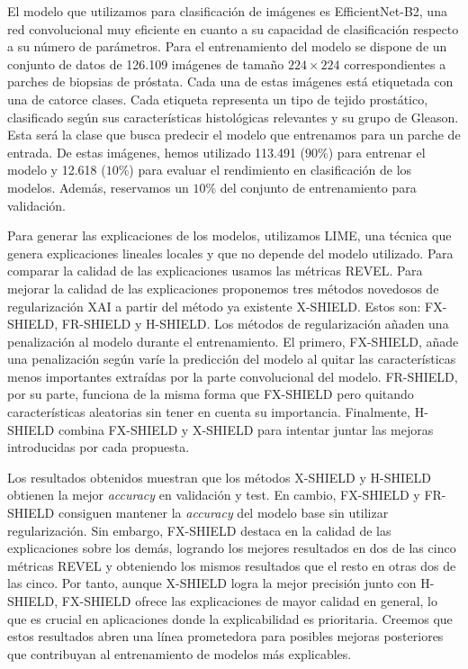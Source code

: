 El modelo que utilizamos para clasificación de imágenes es EfficientNet-B2, una red convolucional muy eficiente en cuanto a su capacidad de clasificación respecto a su número de parámetros. Para el entrenamiento del modelo se dispone de un conjunto de datos de 126.109 imágenes de tamaño $224 \times 224$ correspondientes a parches de biopsias de próstata. Cada una de estas imágenes está etiquetada con una de catorce clases. Cada etiqueta representa un tipo de tejido prostático, clasificado según sus características histológicas relevantes y su grupo de Gleason. Esta será la clase que busca predecir el modelo que entrenamos para un parche de entrada. De estas imágenes, hemos utilizado 113.491 ($90 \%$) para entrenar el modelo y 12.618 ($10 \%$) para evaluar el rendimiento en clasificación de los modelos. Además, reservamos un $10\%$ del conjunto de entrenamiento para validación.

Para generar las explicaciones de los modelos, utilizamos LIME, una técnica que genera explicaciones lineales locales y que no depende del modelo utilizado. Para comparar la calidad de las explicaciones usamos las métricas REVEL. Para mejorar la calidad de las explicaciones proponemos tres métodos novedosos de regularización XAI a partir del método ya existente X-SHIELD. Estos son: FX-SHIELD, FR-SHIELD y H-SHIELD. Los métodos de regularización añaden una penalización al modelo durante el entrenamiento. El primero, FX-SHIELD, añade una penalización según varíe la predicción del modelo al quitar las características menos importantes extraídas por la parte convolucional del modelo. FR-SHIELD, por su parte, funciona de la misma forma que FX-SHIELD pero quitando características aleatorias sin tener en cuenta su importancia. Finalmente, H-SHIELD combina FX-SHIELD y X-SHIELD para intentar juntar las mejoras introducidas por cada propuesta.

Los resultados obtenidos muestran que los métodos X-SHIELD y H-SHIELD obtienen la mejor \textit{accuracy} en validación y test. En cambio, FX-SHIELD y FR-SHIELD consiguen mantener la \textit{accuracy} del modelo base sin utilizar regularización. Sin embargo, FX-SHIELD destaca en la calidad de las explicaciones sobre los demás, logrando los mejores resultados en dos de las cinco métricas REVEL y obteniendo los mismos resultados que el resto en otras dos de las cinco. Por tanto, aunque X-SHIELD logra la mejor precisión junto con H-SHIELD, FX-SHIELD ofrece las explicaciones de mayor calidad en general, lo que es crucial en aplicaciones donde la explicabilidad es prioritaria. Creemos que estos resultados abren una línea prometedora para posibles mejoras posteriores que contribuyan al entrenamiento de modelos más explicables.



\thispagestyle{empty}

\endinput
